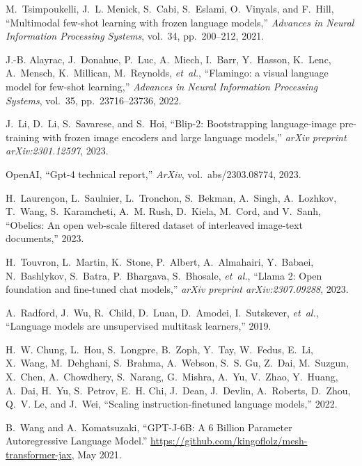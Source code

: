 \begin{thebibliography}{10}

M.~Tsimpoukelli, J.~L. Menick, S.~Cabi, S.~Eslami, O.~Vinyals, and F.~Hill,
  ``Multimodal few-shot learning with frozen language models,'' {\em Advances
  in Neural Information Processing Systems}, vol.~34, pp.~200--212, 2021.

J.-B. Alayrac, J.~Donahue, P.~Luc, A.~Miech, I.~Barr, Y.~Hasson, K.~Lenc,
  A.~Mensch, K.~Millican, M.~Reynolds, {\em et~al.}, ``Flamingo: a visual
  language model for few-shot learning,'' {\em Advances in Neural Information
  Processing Systems}, vol.~35, pp.~23716--23736, 2022.

J.~Li, D.~Li, S.~Savarese, and S.~Hoi, ``Blip-2: Bootstrapping language-image
  pre-training with frozen image encoders and large language models,'' {\em
  arXiv preprint arXiv:2301.12597}, 2023.

OpenAI, ``Gpt-4 technical report,'' {\em ArXiv}, vol.~abs/2303.08774, 2023.

H.~Laurençon, L.~Saulnier, L.~Tronchon, S.~Bekman, A.~Singh, A.~Lozhkov,
  T.~Wang, S.~Karamcheti, A.~M. Rush, D.~Kiela, M.~Cord, and V.~Sanh,
  ``Obelics: An open web-scale filtered dataset of interleaved image-text
  documents,'' 2023.

H.~Touvron, L.~Martin, K.~Stone, P.~Albert, A.~Almahairi, Y.~Babaei,
  N.~Bashlykov, S.~Batra, P.~Bhargava, S.~Bhosale, {\em et~al.}, ``Llama 2:
  Open foundation and fine-tuned chat models,'' {\em arXiv preprint
  arXiv:2307.09288}, 2023.

A.~Radford, J.~Wu, R.~Child, D.~Luan, D.~Amodei, I.~Sutskever, {\em et~al.},
  ``Language models are unsupervised multitask learners,'' 2019.

H.~W. Chung, L.~Hou, S.~Longpre, B.~Zoph, Y.~Tay, W.~Fedus, E.~Li, X.~Wang,
  M.~Dehghani, S.~Brahma, A.~Webson, S.~S. Gu, Z.~Dai, M.~Suzgun, X.~Chen,
  A.~Chowdhery, S.~Narang, G.~Mishra, A.~Yu, V.~Zhao, Y.~Huang, A.~Dai, H.~Yu,
  S.~Petrov, E.~H. Chi, J.~Dean, J.~Devlin, A.~Roberts, D.~Zhou, Q.~V. Le, and
  J.~Wei, ``Scaling instruction-finetuned language models,'' 2022.

B.~Wang and A.~Komatsuzaki, ``{GPT-J-6B: A 6 Billion Parameter Autoregressive
  Language Model}.'' \url{https://github.com/kingoflolz/mesh-transformer-jax},
  May 2021.


\end{thebibliography}

